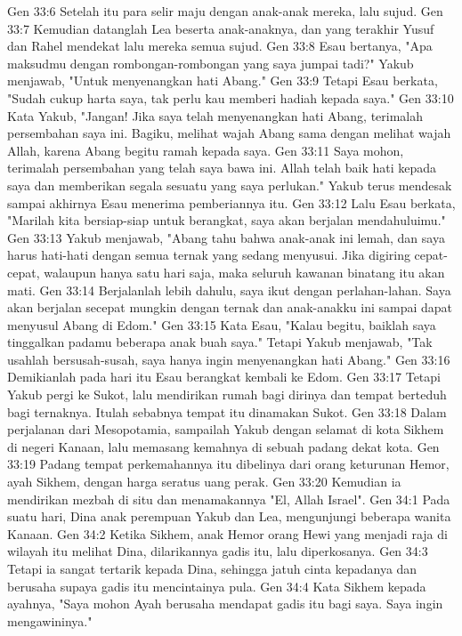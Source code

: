 Gen 33:6  Setelah itu para selir maju dengan anak-anak mereka, lalu sujud.
Gen 33:7  Kemudian datanglah Lea beserta anak-anaknya, dan yang terakhir Yusuf dan Rahel mendekat lalu mereka semua sujud.
Gen 33:8  Esau bertanya, "Apa maksudmu dengan rombongan-rombongan yang saya jumpai tadi?" Yakub menjawab, "Untuk menyenangkan hati Abang."
Gen 33:9  Tetapi Esau berkata, "Sudah cukup harta saya, tak perlu kau memberi hadiah kepada saya."
Gen 33:10  Kata Yakub, "Jangan! Jika saya telah menyenangkan hati Abang, terimalah persembahan saya ini. Bagiku, melihat wajah Abang sama dengan melihat wajah Allah, karena Abang begitu ramah kepada saya.
Gen 33:11  Saya mohon, terimalah persembahan yang telah saya bawa ini. Allah telah baik hati kepada saya dan memberikan segala sesuatu yang saya perlukan." Yakub terus mendesak sampai akhirnya Esau menerima pemberiannya itu.
Gen 33:12  Lalu Esau berkata, "Marilah kita bersiap-siap untuk berangkat, saya akan berjalan mendahuluimu."
Gen 33:13  Yakub menjawab, "Abang tahu bahwa anak-anak ini lemah, dan saya harus hati-hati dengan semua ternak yang sedang menyusui. Jika digiring cepat-cepat, walaupun hanya satu hari saja, maka seluruh kawanan binatang itu akan mati.
Gen 33:14  Berjalanlah lebih dahulu, saya ikut dengan perlahan-lahan. Saya akan berjalan secepat mungkin dengan ternak dan anak-anakku ini sampai dapat menyusul Abang di Edom."
Gen 33:15  Kata Esau, "Kalau begitu, baiklah saya tinggalkan padamu beberapa anak buah saya." Tetapi Yakub menjawab, "Tak usahlah bersusah-susah, saya hanya ingin menyenangkan hati Abang."
Gen 33:16  Demikianlah pada hari itu Esau berangkat kembali ke Edom.
Gen 33:17  Tetapi Yakub pergi ke Sukot, lalu mendirikan rumah bagi dirinya dan tempat berteduh bagi ternaknya. Itulah sebabnya tempat itu dinamakan Sukot.
Gen 33:18  Dalam perjalanan dari Mesopotamia, sampailah Yakub dengan selamat di kota Sikhem di negeri Kanaan, lalu memasang kemahnya di sebuah padang dekat kota.
Gen 33:19  Padang tempat perkemahannya itu dibelinya dari orang keturunan Hemor, ayah Sikhem, dengan harga seratus uang perak.
Gen 33:20  Kemudian ia mendirikan mezbah di situ dan menamakannya "El, Allah Israel".
Gen 34:1  Pada suatu hari, Dina anak perempuan Yakub dan Lea, mengunjungi beberapa wanita Kanaan.
Gen 34:2  Ketika Sikhem, anak Hemor orang Hewi yang menjadi raja di wilayah itu melihat Dina, dilarikannya gadis itu, lalu diperkosanya.
Gen 34:3  Tetapi ia sangat tertarik kepada Dina, sehingga jatuh cinta kepadanya dan berusaha supaya gadis itu mencintainya pula.
Gen 34:4  Kata Sikhem kepada ayahnya, "Saya mohon Ayah berusaha mendapat gadis itu bagi saya. Saya ingin mengawininya."
